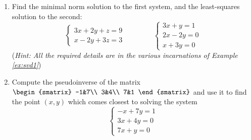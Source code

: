 \begin{exercises}
\begin{enumerate}
		
		\item Find the minimal norm solution to the first system, and the least-squares solution to the second:
		\[
			\begin{cases}
				3x+2y+z=9\\
				x-2y+3z=3
			\end{cases}
			\qquad\qquad
			\begin{cases}
				3x+y=1\\
				2x-2y=0\\
				x+3y=0
			\end{cases}
		\]
		(\emph{Hint: All the required details are in the various incarnations of Example \ref{ex:svd1}})
		
		
		\item Compute the pseudoinverse of the matrix
		$\smash[b]{\begin{smatrix}
			-1&7\\
			3&4\\
			7&1
		\end{smatrix}}$
		and use it to find the point $(x,y)$ which comes closest to solving the system
		\[
			\begin{cases}
				-x+7y=1\\
				3x+4y=0\\
				7x+y=0
			\end{cases}
		\]
	\end{enumerate}
\end{exercises}

\clearpage



